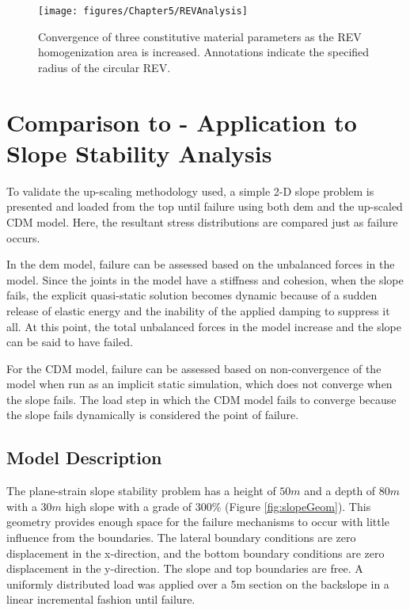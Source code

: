 \begin{figure}[!htb]
\begin{center}
\texttt{[image: figures/Chapter5/REVAnalysis]}
\caption{{\label{fig:revconverge} Convergence of three constitutive material parameters as the REV homogenization area is increased. Annotations indicate the specified radius of the circular REV.%
}}
\end{center}
\end{figure}

\section{Comparison to  - Application to Slope Stability Analysis}

To validate the up-scaling methodology used, a simple 2-D slope problem is presented and loaded from the top until failure using both \acrshort{dem} and the up-scaled CDM model. Here, the resultant stress distributions are compared just as failure occurs. 

In the \acrshort{dem} model, failure can be assessed based on the unbalanced forces in the model. Since the joints in the model have a stiffness and cohesion, when the slope fails, the explicit quasi-static solution becomes dynamic because of a sudden release of elastic energy and the inability of the applied damping to suppress it all. At this point, the total unbalanced forces in the model increase and the slope can be said to have failed. 

For the CDM model, failure can be assessed based on non-convergence of the model when run as an implicit static simulation, which does not converge when the slope fails. The load step in which the CDM model fails to converge because the slope fails dynamically is considered the point of failure.

\subsection{Model Description}

The plane-strain slope stability problem has a height of $50m$ and a depth of $80m$ with a $30m$ high slope with a grade of $300\%$ (Figure \ref{fig:slopeGeom}). This geometry provides enough space for the failure mechanisms to occur with little influence from the boundaries. The lateral boundary conditions are zero displacement in the x-direction, and the bottom boundary conditions are zero displacement in the y-direction. The slope and top boundaries are free. A uniformly distributed load was applied over a 5m section on the backslope in a linear incremental fashion until failure.

